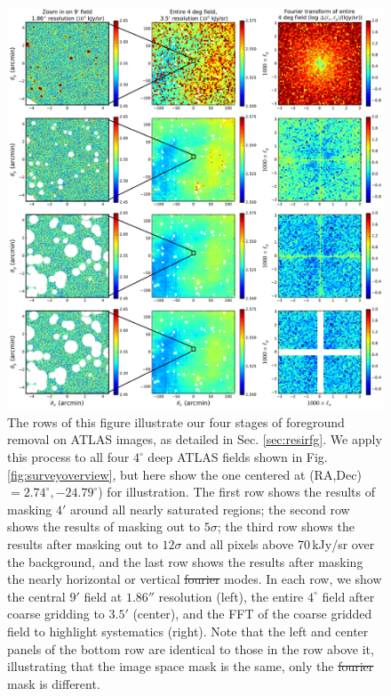 \documentclass[numberedappendix]{emulateapj}
\providecommand{\DIFadd}[1]{{\protect\color{blue}\uwave{#1}}} %
\providecommand{\DIFdel}[1]{{\protect\color{red}\sout{#1}}}                      %
\providecommand{\DIFaddFL}[1]{\DIFadd{#1}} %
\providecommand{\DIFdelFL}[1]{\DIFdel{#1}} %
\providecommand{\DIFaddbeginFL}{} %
\providecommand{\DIFaddendFL}{} %
\providecommand{\DIFdelbeginFL}{} %
\providecommand{\DIFdelendFL}{} %
\begin{document}
\begin{figure}[h]
\centering
\DIFdelbeginFL %
\DIFdelendFL \DIFaddbeginFL \includegraphics[width=7in]{chap5_xcor/big_foreground_masking_study_2_magoffset=20_56+0_274.pdf}
\DIFaddendFL \caption[Images of our 850\,nm field after various stages of foreground masking.]{The rows of this figure illustrate our four stages of foreground removal on ATLAS images, as detailed in Sec. \ref{sec:resirfg}. We apply this process to all four $4^\circ$ deep ATLAS fields shown in Fig. \ref{fig:surveyoverview}, but here show the one centered at (RA,Dec)$=2.74^\circ, -24.79^\circ$) for illustration. The first row shows the results of masking $4'$ around all nearly saturated regions; the second row shows the results of masking out to $5\sigma$; the third row shows the results after masking out to $12\sigma$ and all pixels above 70\,kJy/sr over the background, and the last row shows the results after masking the nearly horizontal or vertical \DIFdelbeginFL \DIFdelFL{fourier }\DIFdelendFL \DIFaddbeginFL \DIFaddFL{Fourier }\DIFaddendFL modes. In each row, we show the central $9'$ field at $1.86''$ resolution (left), the entire $4^\circ$ field after coarse gridding to $3.5'$ (center), and the FFT of the coarse gridded field to highlight systematics (right). Note that the left and center panels of the bottom row are identical to those in the row above it, illustrating that the image space mask is the same, only the \DIFdelbeginFL \DIFdelFL{fourier }\DIFdelendFL \DIFaddbeginFL \DIFaddFL{Fourier }\DIFaddendFL mask is different.}
\label{fig:bigfgmaskingstudy}
\end{figure}
\end{document}
